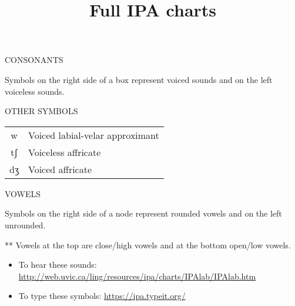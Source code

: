 \documentclass{article}
\title{Full IPA charts}
\date{}
\newcommand{\headspace}{0.4cm}
\begin{document}
  \maketitle
  CONSONANTS

  \vspace{\headspace}

  \begin{adjustbox}{width=\textwidth}
    
  \end{adjustbox}

  {\tiny *Symbols on the right side of a box represent voiced sounds and on the left voiceless sounds.}

  \vspace{2cm}

  \parbox[l]{0.5\textwidth}{
    OTHER SYMBOLS

    \vspace{\headspace}

    \begin{adjustbox}{width=0.3\textwidth}
      \begin{tabular}{c l}
        w  & Voiced labial-velar approximant \\
        tʃ & Voiceless affricate \\
        dʒ & Voiced affricate
      \end{tabular}
    \end{adjustbox}
  }
  \parbox[r]{0.5\textwidth}{
    VOWELS

    \vspace{\headspace}

    \begin{adjustbox}{width=0.3\textwidth}
      
    \end{adjustbox}
  }

  \begin{flushright}
    {\tiny *Symbols on the right side of a node represent rounded vowels and on the left unrounded.

    ** Vowels at the top are close/high vowels and at the bottom open/low vowels.}
  \end{flushright}

  {\small
    \begin{itemize}
      \item To hear these sounds: \url{http://web.uvic.ca/ling/resources/ipa/charts/IPAlab/IPAlab.htm}
      \item To type these symbols: \url{https://ipa.typeit.org/}
    \end{itemize}
  }
\end{document}
